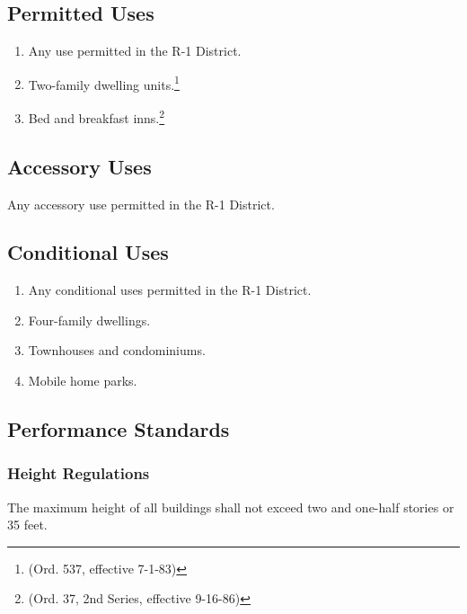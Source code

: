 \subsection{Permitted Uses}
\begin{enumerate}[{\indent}1)]
    \item Any use permitted in the R-1 District.  
    \item Two-family dwelling units.\footnote{(Ord. 537, effective 7-1-83)}
    \item Bed and breakfast inns.\footnote{(Ord. 37, 2nd Series, effective 9-16-86)}
\end{enumerate}
\subsection{Accessory Uses}
Any accessory use permitted in the R-1 District.
\subsection{Conditional Uses}
\begin{enumerate}[{\indent}1)]
    \item Any conditional uses permitted in the R-1 District.
    \item Four-family dwellings.
    \item Townhouses and condominiums.  
    \item Mobile home parks.
\end{enumerate}
\subsection{Performance Standards}
\subsubsection{Height Regulations}
The maximum height of all buildings shall not exceed two and one-half stories or 35 feet.
